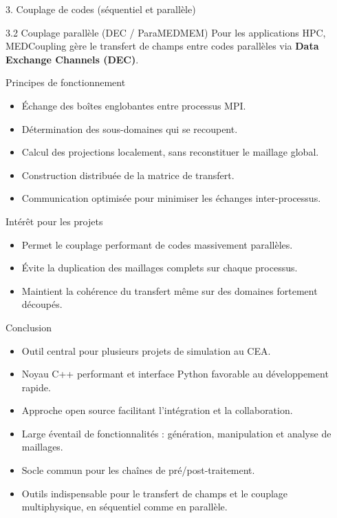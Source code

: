 \begin{frame}{3. Couplage de codes (séquentiel et parallèle)}
\begin{block}{3.2 Couplage parallèle (DEC / ParaMEDMEM)}
\protect\hypertarget{couplage-paralluxe8le-dec-paramedmem}{}
Pour les applications HPC, MEDCoupling gère le transfert de champs entre
codes parallèles via \textbf{Data Exchange Channels (DEC)}.

\begin{block}{Principes de fonctionnement}
\protect\hypertarget{principes-de-fonctionnement}{}
\begin{itemize}
\tightlist
\item
  Échange des boîtes englobantes entre processus MPI.
\item
  Détermination des sous-domaines qui se recoupent.
\item
  Calcul des projections localement, sans reconstituer le maillage
  global.
\item
  Construction distribuée de la matrice de transfert.
\item
  Communication optimisée pour minimiser les échanges inter-processus.
\end{itemize}
\end{block}

\begin{block}{Intérêt pour les projets}
\protect\hypertarget{intuxe9ruxeat-pour-les-projets-2}{}
\begin{itemize}
\tightlist
\item
  Permet le couplage performant de codes massivement parallèles.
\item
  Évite la duplication des maillages complets sur chaque processus.
\item
  Maintient la cohérence du transfert même sur des domaines fortement
  découpés.
\end{itemize}
\end{block}
\end{block}
\end{frame}

\begin{frame}{Conclusion}
\protect\hypertarget{conclusion}{}
\begin{itemize}
\tightlist
\item
  Outil central pour plusieurs projets de simulation au CEA.
\item
  Noyau C++ performant et interface Python favorable au développement
  rapide.
\item
  Approche open source facilitant l'intégration et la collaboration.
\item
  Large éventail de fonctionnalités : génération, manipulation et
  analyse de maillages.
\item
  Socle commun pour les chaînes de pré/post-traitement.
\item
  Outils indispensable pour le transfert de champs et le couplage
  multiphysique, en séquentiel comme en parallèle.
\end{itemize}
\end{frame}
